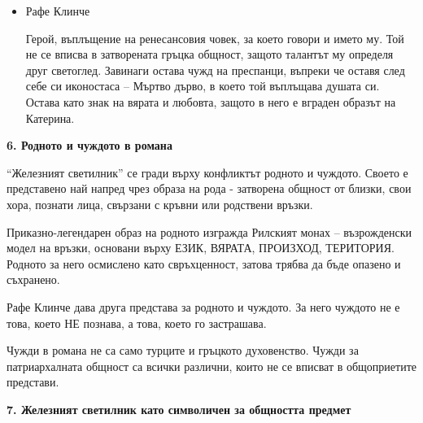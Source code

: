 \documentclass[12pt,a4paper]{article}
\begin{document}
\begin{itemize}
   \hspace*{0.5cm} Най-малката дъщеря на Глаушеви е въплъщение на самия живот (буйна непокорна, красива, истинска). Тя става герой нарушител, защото превръща любовта в своя религия: изпреварва времето си, следвайки поривите на сърцето, а не на разума. Прави свой собствен свободен избор, пренебрегвайки неписаните правила на поведение. Катерина става жертва на консервативното мислене.
   \vspace{-0.2cm}
    \item Рафе Клинче
     
   \hspace*{0.5cm} Герой, въплъщение на ренесансовия човек, за което говори и името му. Той не се вписва в затворената гръцка общност, защото талантът му определя друг светоглед. Завинаги остава чужд на преспанци, въпреки че оставя след себе си иконостаса – Мъртво дърво, в което той въплъщава душата си. Остава като знак на вярата и любовта, защото в него е вграден образът на Катерина.
\end{itemize}
\vspace{0.1cm}
 
\textbf{6. Родното и чуждото в романа}
\vspace{0.1cm}
 
\indent “Железният светилник” се гради върху конфликтът родното и чуждото. Своето е представено най напред чрез образа на рода - затворена общност от близки, свои хора, познати лица, свързани с кръвни или родствени връзки.
\vspace{0.1cm}
 
\indent Приказно-легендарен образ на родното изгражда Рилският монах – възрожденски модел на връзки, основани върху ЕЗИК, ВЯРАТА, ПРОИЗХОД, ТЕРИТОРИЯ. Родното за него осмислено като свръхценност, затова трябва да бъде опазено и съхранено.
\vspace{0.1cm}
 
\indent Рафе Клинче дава друга представа за родното и чуждото. За него чуждото не е това, което НЕ познава, а това, което го застрашава.
\vspace{0.1cm}
 
\indent Чужди в романа не са само турците и гръцкото духовенство. Чужди за патриархалната общност са всички различни, които не се вписват в общоприетите представи.
\vspace{0.1cm}
 
\textbf{7. Железният светилник като символичен за общността предмет}
\vspace{0.1cm}
 
\end{document}
